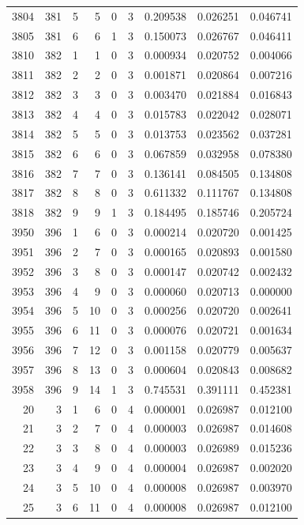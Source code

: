 \begin{longtable}{rrrrrrrrr}
3804 & 381 & 5 & 5 & 0 & 3 & 0.209538 & 0.026251 & 0.046741 \\
3805 & 381 & 6 & 6 & 1 & 3 & 0.150073 & 0.026767 & 0.046411 \\
3810 & 382 & 1 & 1 & 0 & 3 & 0.000934 & 0.020752 & 0.004066 \\
3811 & 382 & 2 & 2 & 0 & 3 & 0.001871 & 0.020864 & 0.007216 \\
3812 & 382 & 3 & 3 & 0 & 3 & 0.003470 & 0.021884 & 0.016843 \\
3813 & 382 & 4 & 4 & 0 & 3 & 0.015783 & 0.022042 & 0.028071 \\
3814 & 382 & 5 & 5 & 0 & 3 & 0.013753 & 0.023562 & 0.037281 \\
3815 & 382 & 6 & 6 & 0 & 3 & 0.067859 & 0.032958 & 0.078380 \\
3816 & 382 & 7 & 7 & 0 & 3 & 0.136141 & 0.084505 & 0.134808 \\
3817 & 382 & 8 & 8 & 0 & 3 & 0.611332 & 0.111767 & 0.134808 \\
3818 & 382 & 9 & 9 & 1 & 3 & 0.184495 & 0.185746 & 0.205724 \\
3950 & 396 & 1 & 6 & 0 & 3 & 0.000214 & 0.020720 & 0.001425 \\
3951 & 396 & 2 & 7 & 0 & 3 & 0.000165 & 0.020893 & 0.001580 \\
3952 & 396 & 3 & 8 & 0 & 3 & 0.000147 & 0.020742 & 0.002432 \\
3953 & 396 & 4 & 9 & 0 & 3 & 0.000060 & 0.020713 & 0.000000 \\
3954 & 396 & 5 & 10 & 0 & 3 & 0.000256 & 0.020720 & 0.002641 \\
3955 & 396 & 6 & 11 & 0 & 3 & 0.000076 & 0.020721 & 0.001634 \\
3956 & 396 & 7 & 12 & 0 & 3 & 0.001158 & 0.020779 & 0.005637 \\
3957 & 396 & 8 & 13 & 0 & 3 & 0.000604 & 0.020843 & 0.008682 \\
3958 & 396 & 9 & 14 & 1 & 3 & 0.745531 & 0.391111 & 0.452381 \\
20 & 3 & 1 & 6 & 0 & 4 & 0.000001 & 0.026987 & 0.012100 \\
21 & 3 & 2 & 7 & 0 & 4 & 0.000003 & 0.026987 & 0.014608 \\
22 & 3 & 3 & 8 & 0 & 4 & 0.000003 & 0.026989 & 0.015236 \\
23 & 3 & 4 & 9 & 0 & 4 & 0.000004 & 0.026987 & 0.002020 \\
24 & 3 & 5 & 10 & 0 & 4 & 0.000008 & 0.026987 & 0.003970 \\
25 & 3 & 6 & 11 & 0 & 4 & 0.000008 & 0.026987 & 0.012100 \\

\end{longtable}
